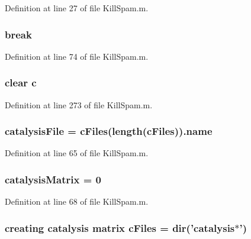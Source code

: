 Definition at line 27 of file Kill\-Spam.\-m.

\hypertarget{a00029_a91cf6fbebedd86150a36e5ac3d5d3bfc}{
\subsubsection[{break}]{\setlength{\rightskip}{0pt plus 5cm}break}}\label{a00029_a91cf6fbebedd86150a36e5ac3d5d3bfc}


Definition at line 74 of file Kill\-Spam.\-m.

\hypertarget{a00029_a8e54ca14679a1ce9245a3b7d55d95570}{
\subsubsection[{c}]{\setlength{\rightskip}{0pt plus 5cm}clear c}}\label{a00029_a8e54ca14679a1ce9245a3b7d55d95570}


Definition at line 273 of file Kill\-Spam.\-m.

\hypertarget{a00029_a33e70cf5b45cb59005b82d30202f0b69}{
\subsubsection[{catalysis\-File}]{\setlength{\rightskip}{0pt plus 5cm}catalysis\-File = {\bf c\-Files}(length({\bf c\-Files})).{\bf name}}}\label{a00029_a33e70cf5b45cb59005b82d30202f0b69}


Definition at line 65 of file Kill\-Spam.\-m.

\hypertarget{a00029_a0810027f58d6be965e44b7b84c44ace8}{
\subsubsection[{catalysis\-Matrix}]{\setlength{\rightskip}{0pt plus 5cm}catalysis\-Matrix = 0}}\label{a00029_a0810027f58d6be965e44b7b84c44ace8}


Definition at line 68 of file Kill\-Spam.\-m.

\hypertarget{a00029_a9eab57ccb42a39c704f47dc30e4f4515}{
\subsubsection[{c\-Files}]{\setlength{\rightskip}{0pt plus 5cm}creating {\bf catalysis} matrix c\-Files = dir('{\bf catalysis}$\ast$')}}\label{a00029_a9eab57ccb42a39c704f47dc30e4f4515}


